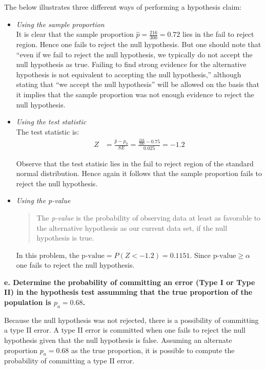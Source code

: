 \documentclass{article}
\begin{document}
The below illustrates three different ways of performing a hypothesis claim:
\vspace{0.1in}
\begin{itemize}
\item \textit{Using the sample proportion}\\
It is clear that the sample proportion $\hat{p}=\frac{216}{300}=0.72$ lies in the fail to reject region.  Hence one fails to reject the null hypothesis. But one should note that  ``even if we fail to reject 
the null hypothesis, we typically do not accept the null hypothesis as true. Failing to find strong evidence for the alternative hypothesis is not equivalent to accepting
the null hypothesis,''\cite{OS}  although stating that ``we accept the null hypothesis'' will be allowed on the basis that it implies that the sample proportion was not enough evidence to reject the null hypothesis.\\


\item \textit{Using the test statistic}\\
The test statistic is:
\begin{align*}
Z & = \frac{\hat{p}-p_0}{SE} = \frac{\frac{216}{300}-0.75}{0.025} = -1.2
\end{align*}

Observe that the test statisic lies in the fail to reject region of the standard normal distribution.  Hence again it follows that the sample proportion fails to reject the null hypothesis.\\


\item \textit{Using the p-value}\\
\begin{quote}
The \emph{p-value} is the probability of observing data at least as favorable to the alternative hypothesis as our current data set, if the null hypothesis is true.\cite{OS}
\end{quote}
In this problem, the $\text{p-value}=P(Z<-1.2)=0.1151$. Since $\text{p-value}\geq\alpha$ one fails to reject the null hypothesis.\\

\end{itemize}
\newpage

\textbf{e. Determine the probability of committing an error (Type I or Type II) in the hypothesis test assumming that the true proportion of the population is $p_a=0.68$.}

Because the null hypothesis was not rejected, there is a possibility of committing a type II error. A type II error is committed when one fails to reject the null hypothesis given that the null hypothesis is false.  Assuming an alternate proportion $p_a=0.68$ as the true proportion, it is possible to compute the probability of committing a type II error.\\
\end{document}
